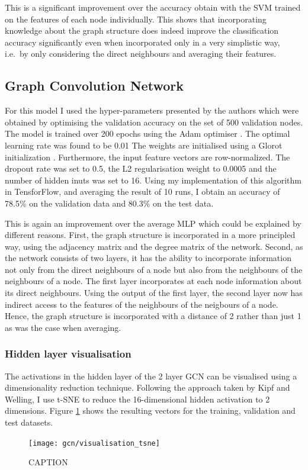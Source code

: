 \documentclass[12pt]{article}
\theoremstyle{definition}
\begin{document}
This is a significant improvement over the accuracy obtain with the SVM trained on the features of each node individually. This shows that incorporating knowledge about the graph structure does indeed improve the classification accuracy significantly even when incorporated only in a very simplistic way, i.e.\ by only considering the direct neighbours and averaging their features.

\subsection{Graph Convolution Network}
For this model I used the hyper-parameters presented by the authors which were obtained by optimising the validation accuracy on the set of 500 validation nodes. The model is trained over 200 epochs using the Adam optimiser \cite{kingma2014adam}. The optimal learning rate was found to be 0.01 The weights are initialised using a Glorot initialization \cite{glorot2010understanding}. Furthermore, the input feature vectors are row-normalized. The dropout rate was set to 0.5, the L2 regularisation weight to 0.0005 and the number of hidden inuts was set to 16. Using my implementation of this algorithm in TensforFlow, and averaging the result of 10 runs, I obtain an accuracy of 78.5\% on the validation data and 80.3\% on the test data.

This is again an improvement over the average MLP which could be explained by different reasons. First, the graph structure is incorporated in a more principled way, using the adjacency matrix and the degree matrix of the network. Second, as the network consists of two layers, it has the ability to incorporate information not only from the direct neighbours of a node but also from the neighbours of the neighbours of a node. The first layer incorporates at each node information about its direct neighbours. Using the output of the first layer, the second layer now has indirect access to the features of the neighbours of the neigbours of a node. Hence, the graph structure is incorporated with a distance of 2 rather than just 1 as was the case when averaging.

\subsubsection{Hidden layer visualisation}
The activations in the hidden layer of the 2 layer GCN can be visualised using a dimensionality reduction technique. Following the approach taken by Kipf and Welling, I use t-SNE \cite{maaten2008visualizing} to reduce the 16-dimensional hidden activation to 2 dimensions. Figure \ref{fig/gcn_tsne} shows the resulting vectors for the training, validation and test datasets.
\begin{figure}[h]
	\texttt{[image: gcn/visualisation\_tsne]}
	\centering
	\caption{CAPTION}
	\label{fig/gcn_tsne}
\end{figure}
\end{document}
